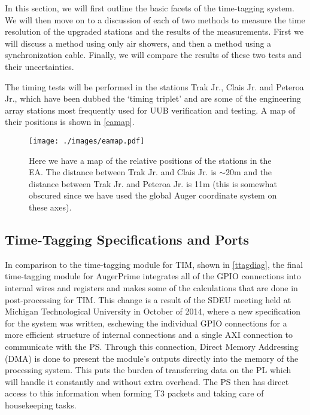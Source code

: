 In this section, we will first outline the basic facets of the time-tagging system. We will then move on to a discussion of each of two methods to measure the time resolution of the upgraded stations and the results of the measurements. First we will discuss a method using only air showers, and then a method using a synchronization cable. Finally, we will compare the results of these two tests and their uncertainties. 

The timing tests will be performed in the stations Trak Jr., Clais Jr. and Peteroa Jr., which have been dubbed the `timing triplet' and are some of the engineering array stations most frequently used for UUB verification and testing. A map of their positions is shown in \autoref{eamap}.
\begin{figure}[H]
\centering
\texttt{[image: ./images/eamap.pdf]}
\caption[Timing Triplet Map]{Here we have a map of the relative positions of the stations in the EA. The distance between  Trak Jr. and Clais Jr. is $\sim$20m and the distance between Trak Jr. and Peteroa Jr. is 11m (this is somewhat obscured since we have used the global Auger coordinate system on these axes).}
\label{eamap}
\end{figure}

\subsection{Time-Tagging Specifications and Ports} %
In comparison to the time-tagging module for TIM, shown in \autoref{ttagdiag}, the final time-tagging module for AugerPrime integrates all of the GPIO connections into internal wires and registers and makes some of the calculations that are done in post-processing for TIM. This change is a result of the SDEU meeting held at Michigan Technological University in October of 2014, where a new specification for the system was written, eschewing the individual GPIO connections for a more efficient structure of internal connections and a single AXI connection to communicate with the PS. Through this connection, Direct Memory Addressing (DMA) is done to present the module's outputs directly into the memory of the processing system. This puts the burden of transferring data on the PL which will handle it constantly and without extra overhead. The PS then has direct access to this information when forming T3 packets and taking care of housekeeping tasks.


